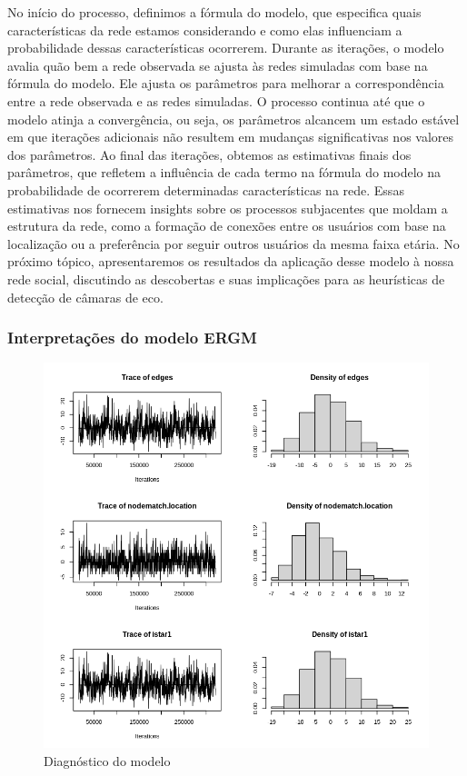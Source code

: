 No início do processo, definimos a fórmula do modelo, que especifica quais características da rede estamos considerando e como elas influenciam a probabilidade dessas características ocorrerem. Durante as iterações, o modelo avalia quão bem a rede observada se ajusta às redes simuladas com base na fórmula do modelo. Ele ajusta os parâmetros para melhorar a correspondência entre a rede observada e as redes simuladas. O processo continua até que o modelo atinja a convergência, ou seja, os parâmetros alcancem um estado estável em que iterações adicionais não resultem em mudanças significativas nos valores dos parâmetros. Ao final das iterações, obtemos as estimativas finais dos parâmetros, que refletem a influência de cada termo na fórmula do modelo na probabilidade de ocorrerem determinadas características na rede. Essas estimativas nos fornecem insights sobre os processos subjacentes que moldam a estrutura da rede, como a formação de conexões entre os usuários com base na localização ou a preferência por seguir outros usuários da mesma faixa etária. No próximo tópico, apresentaremos os resultados da aplicação desse modelo à nossa rede social, discutindo as descobertas e suas implicações para as heurísticas de detecção de câmaras de eco.

\subsubsection*{Interpretações do modelo ERGM}
\lipsum[1]

\begin{figure}[!htb]
	\caption{Diagnóstico do modelo}
	\label{fig:ergm_diagnostics}
	\centering
	\includegraphics[scale=0.5]{images/ergm_diagnostics.png}
	\fautor
\end{figure}